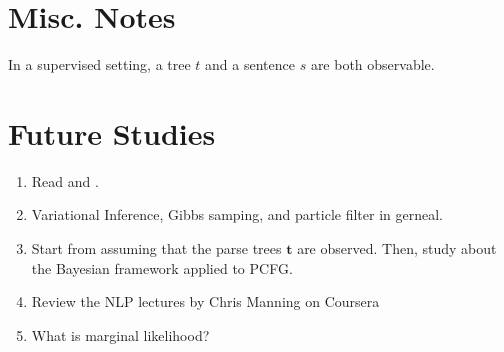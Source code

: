 \documentclass[11pt]{article}
\begin{document}
\section{Misc. Notes}
In a supervised setting, a tree $t$ and a sentence $s$ are both observable.


\section{Future Studies}
\begin{enumerate}
 \item Read \cite{beal2003variational} and \cite{kurihara2004application}.
 \item Variational Inference, Gibbs samping, and particle filter in gerneal.
 \item Start from assuming that the parse trees $\boldsymbol{t}$ are observed. Then, study about the Bayesian framework applied to PCFG.
 \item Review the NLP lectures by Chris Manning on Coursera
 \item What is marginal likelihood?
\end{enumerate}






\end{document}
